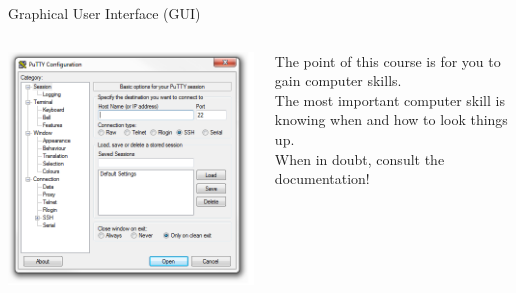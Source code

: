\documentclass[11pt]{beamer}
\let\OldTexttt\texttt
\renewcommand{\texttt}[1]{\OldTexttt{\color{teal}{#1}}}
\begin{document}
\begin{frame}{Graphical User Interface (GUI)}
\begin{columns}
\begin{column}{0.6\textwidth}
\includegraphics[scale=0.4]{putty.png}
\end{column}
\begin{column}{0.38\textwidth}
The point of this course is for you to gain computer skills. \\ 
\vspace{0.5em}
The most important computer skill is knowing when and how to look things up. \\
\vspace{0.5em}
When in doubt, consult the documentation! 
\end{column}
\end{columns}
\end{frame}

\end{document}
